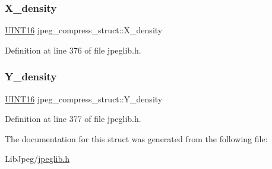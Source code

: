 \subsubsection{\texorpdfstring{X\_density}{X\_density}}
{\footnotesize\ttfamily \mbox{\hyperlink{jmorecfg_8h_a805c2c164bdd38d72a30c46e84fb568b}{U\+I\+N\+T16}} jpeg\+\_\+compress\+\_\+struct\+::\+X\+\_\+density}



Definition at line 376 of file jpeglib.\+h.

\mbox{\label{structjpeg__compress__struct_a978dc1c187fab34211757a134ebf4adb}} 
\subsubsection{\texorpdfstring{Y\_density}{Y\_density}}
{\footnotesize\ttfamily \mbox{\hyperlink{jmorecfg_8h_a805c2c164bdd38d72a30c46e84fb568b}{U\+I\+N\+T16}} jpeg\+\_\+compress\+\_\+struct\+::\+Y\+\_\+density}



Definition at line 377 of file jpeglib.\+h.



The documentation for this struct was generated from the following file\+:\begin{DoxyCompactItemize}
\item 
Lib\+Jpeg/\mbox{\hyperlink{jpeglib_8h}{jpeglib.\+h}}\end{DoxyCompactItemize}
